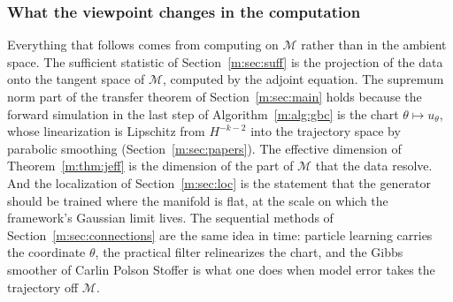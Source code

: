 \subsubsection{What the viewpoint changes in the computation} Everything that follows comes from computing on $\mathcal M$ rather than in the ambient space. The sufficient statistic of Section~\ref{m:sec:suff} is the projection of the data onto the tangent space of $\mathcal M$, computed by the adjoint equation. The supremum norm part of the transfer theorem of Section~\ref{m:sec:main} holds because the forward simulation in the last step of Algorithm~\ref{m:alg:gbc} is the chart $\theta\mapsto u_\theta$, whose linearization is Lipschitz from $H^{-k-2}$ into the trajectory space by parabolic smoothing (Section~\ref{m:sec:papers}). The effective dimension of Theorem~\ref{m:thm:jeff} is the dimension of the part of $\mathcal M$ that the data resolve. And the localization of Section~\ref{m:sec:loc} is the statement that the generator should be trained where the manifold is flat, at the scale on which the framework's Gaussian limit lives. The sequential methods of Section~\ref{m:sec:connections} are the same idea in time: particle learning carries the coordinate $\theta$, the practical filter relinearizes the chart, and the Gibbs smoother of Carlin Polson Stoffer is what one does when model error takes the trajectory off $\mathcal M$.
